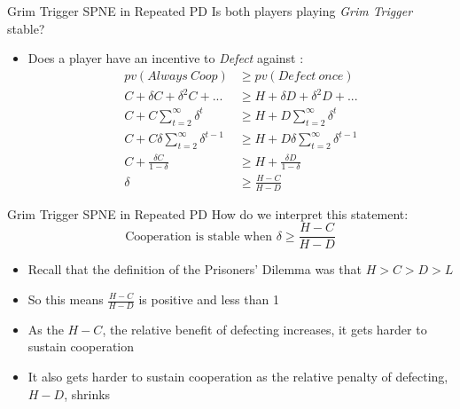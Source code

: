 \begin{frame}{Grim Trigger SPNE in Repeated PD}
  Is both players playing \textit{Grim Trigger} stable?
  \begin{itemize}
    \item Does a player have an incentive to \textit{Defect} against :
    \vspace{-5mm}
    \begin{align*}
      pv(Always~Coop) & \geq pv(Defect~once) \\
      C + \delta C + \delta^2 C + ...      & \geq H + \delta D + \delta^2 D + ...\\
      C + C \sum_{t=2}^{\infty} \delta^{t} & \geq H + D \sum_{t=2}^{\infty} \delta^{t} \\ 
      C + C \delta \sum_{t=2}^{\infty} \delta^{t-1} & \geq H + D \delta \sum_{t=2}^{\infty} \delta^{t-1} \\ 
      C + \frac{\delta C}{1 - \delta} & \geq H + \frac{\delta D}{1 - \delta} \\
      \delta & \geq \frac{H - C}{H - D}
    \end{align*}
  \end{itemize}
\end{frame}

\begin{frame}{Grim Trigger SPNE in Repeated PD}
  How do we interpret this statement:
  $$\text{Cooperation is stable when } \delta \geq \frac{H - C}{H - D}  $$ 
  \begin{itemize}
    \item Recall that the definition of the Prisoners' Dilemma was that $H > C > D > L$
    \item So this means $\frac{H - C}{H - D}$ is positive and less than 1 
    \item As the $H - C$, the relative benefit of defecting increases,
    it gets harder to sustain cooperation
    \item It also gets harder to sustain cooperation as the relative penalty of defecting, $H - D$, shrinks 
  \end{itemize}
\end{frame}

